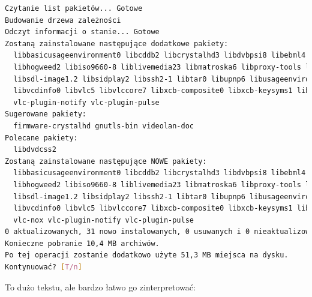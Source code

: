 \begin{lstlisting}[language=bash]
Czytanie list pakietów... Gotowe
Budowanie drzewa zależności       
Odczyt informacji o stanie... Gotowe
Zostaną zainstalowane następujące dodatkowe pakiety:
  libbasicusageenvironment0 libcddb2 libcrystalhd3 libdvbpsi8 libebml4 libgnutls28 libgroupsock1
  libhogweed2 libiso9660-8 liblivemedia23 libmatroska6 libproxy-tools libresid-builder0c2a
  libsdl-image1.2 libsidplay2 libssh2-1 libtar0 libupnp6 libusageenvironment1 libva-x11-1
  libvcdinfo0 libvlc5 libvlccore7 libxcb-composite0 libxcb-keysyms1 libxcb-xv0 vlc-data vlc-nox
  vlc-plugin-notify vlc-plugin-pulse
Sugerowane pakiety:
  firmware-crystalhd gnutls-bin videolan-doc
Polecane pakiety:
  libdvdcss2
Zostaną zainstalowane następujące NOWE pakiety:
  libbasicusageenvironment0 libcddb2 libcrystalhd3 libdvbpsi8 libebml4 libgnutls28 libgroupsock1
  libhogweed2 libiso9660-8 liblivemedia23 libmatroska6 libproxy-tools libresid-builder0c2a
  libsdl-image1.2 libsidplay2 libssh2-1 libtar0 libupnp6 libusageenvironment1 libva-x11-1
  libvcdinfo0 libvlc5 libvlccore7 libxcb-composite0 libxcb-keysyms1 libxcb-xv0 vlc vlc-data
  vlc-nox vlc-plugin-notify vlc-plugin-pulse
0 aktualizowanych, 31 nowo instalowanych, 0 usuwanych i 0 nieaktualizowanych.
Konieczne pobranie 10,4 MB archiwów.
Po tej operacji zostanie dodatkowo użyte 51,3 MB miejsca na dysku.
Kontynuować? [T/n] 
\end{lstlisting}

To dużo tekstu, ale bardzo łatwo go zinterpretować:

